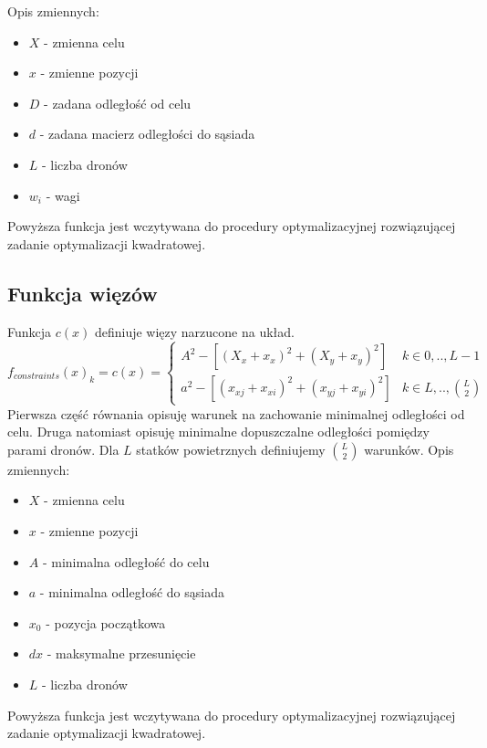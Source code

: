 \documentclass[a4paper, 11pt, oneside]{article}
\begin{document}
Opis zmiennych:
\begin{itemize}
\item $X$ - zmienna celu
\item $x$ - zmienne pozycji 
\item $D$ - zadana odległość od celu
\item $d$ - zadana macierz odległości do sąsiada
\item $L$ - liczba dronów
\item $w_i$ - wagi
\end{itemize}

Powyższa funkcja jest wczytywana do procedury optymalizacyjnej rozwiązującej zadanie optymalizacji kwadratowej.
\subsection{Funkcja więzów} 
Funkcja $c(x)$ definiuje więzy narzucone na układ.
\[ f_{constraints}(x)_k=c(x)=\begin{cases} 
      A^2-[(X_x+x_x)^2+(X_y+x_y)^2] & k\in{ 0,..,L-1} \\
      a^2-[(x_{xj}+x_{xi})^2+(x_{yj}+x_{yi})^2] & k\in{ L,..,\binom{L}{2}} 
      
   \end{cases}
\]
Pierwsza część równania opisuję warunek na zachowanie minimalnej  odległości od celu. Druga natomiast opisuję minimalne dopuszczalne odległości pomiędzy parami dronów. Dla $L$ statków powietrznych definiujemy $\binom{L}{2}$ warunków.
Opis zmiennych:
\begin{itemize}
\item $X$ - zmienna celu
\item $x$ - zmienne pozycji
\item $A$  - minimalna odległość do celu
\item $a$ -  minimalna odległość do sąsiada
\item $x_0$ - pozycja początkowa
\item $dx$ - maksymalne przesunięcie
\item $L$ - liczba dronów
\end{itemize}
Powyższa funkcja jest wczytywana do procedury optymalizacyjnej rozwiązującej zadanie optymalizacji kwadratowej.
\end{document}
